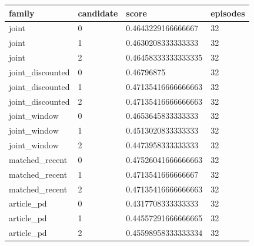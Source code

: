\begin{tabular}{llll}
family & candidate & score & episodes \\
\hline
joint & 0 & 0.4643229166666667 & 32 \\
joint & 1 & 0.4630208333333333 & 32 \\
joint & 2 & 0.46458333333333335 & 32 \\
joint\_discounted & 0 & 0.46796875 & 32 \\
joint\_discounted & 1 & 0.47135416666666663 & 32 \\
joint\_discounted & 2 & 0.47135416666666663 & 32 \\
joint\_window & 0 & 0.4653645833333333 & 32 \\
joint\_window & 1 & 0.4513020833333333 & 32 \\
joint\_window & 2 & 0.4473958333333333 & 32 \\
matched\_recent & 0 & 0.47526041666666663 & 32 \\
matched\_recent & 1 & 0.4713541666666667 & 32 \\
matched\_recent & 2 & 0.47135416666666663 & 32 \\
article\_pd & 0 & 0.4317708333333333 & 32 \\
article\_pd & 1 & 0.44557291666666665 & 32 \\
article\_pd & 2 & 0.45598958333333334 & 32 \\
\end{tabular}
